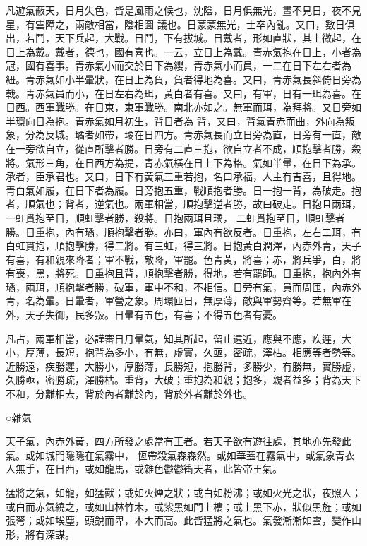 \begin{pinyinscope}
 凡遊氣蔽天，日月失色，皆是風雨之候也，沈陰，日月俱無光，晝不見日，夜不見星，有雲障之，兩敵相當，陰相圖
 議也。日蒙蒙無光，士卒內亂。又曰，數日俱出，若鬥，天下兵起，大戰。日鬥，下有拔城。日戴者，形如直狀，其上微起，在日上為戴。戴者，德也，國有喜也。一云，立日上為戴。青赤氣抱在日上，小者為冠，國有喜事。青赤氣小而交於日下為纓，青赤氣小而員，一二在日下左右者為紐。青赤氣如小半暈狀，在日上為負，負者得地為喜。又曰，青赤氣長斜倚日旁為戟。青赤氣員而小，在日左右為珥，黃白者有喜。又曰，有軍，日有一珥為喜。在日西。西軍戰勝。在日東，東軍戰勝。南北亦如之。無軍而珥，為拜將。又日旁如半環向日為抱。青赤氣如月初生，背日者為
 背，又曰，背氣青赤而曲，外向為叛象，分為反城。璚者如帶，璚在日四方。青赤氣長而立日旁為直，日旁有一直，敵在一旁欲自立，從直所擊者勝。日旁有二直三抱，欲自立者不成，順抱擊者勝，殺將。氣形三角，在日西方為提，青赤氣橫在日上下為格。氣如半暈，在日下為承。承者，臣承君也。又曰，日下有黃氣三重若抱，名曰承福，人主有吉喜，且得地。青白氣如履，在日下者為履。日旁抱五重，戰順抱者勝。日一抱一背，為破走。抱者，順氣也；背者，逆氣也。兩軍相當，順抱擊逆者勝，故曰破走。日抱且兩珥，一虹貫抱至日，順虹擊者勝，殺將。日抱兩珥且璚，
 二虹貫抱至日，順虹擊者勝。日重抱，內有璚，順抱擊者勝。亦曰，軍內有欲反者。日重抱，左右二珥，有白虹貫抱，順抱擊勝，得二將。有三虹，得三將。日抱黃白潤澤，內赤外青，天子有喜，有和親來降者；軍不戰，敵降，軍罷。色青黃，將喜；赤，將兵爭，白，將有喪，黑，將死。日重抱且背，順抱擊者勝，得地，若有罷師。日重抱，抱內外有璚，兩珥，順抱擊者勝，破軍，軍中不和，不相信。日旁有氣，員而周匝，內赤外青，名為暈。日暈者，軍營之象。周環匝日，無厚薄，敵與軍勢齊等。若無軍在外，天子失御，民多叛。日暈有五色，有喜；不得五色者有憂。



 凡占，兩軍相當，必謹審日月暈氣，知其所起，留止遠近，應與不應，疾遲，大小，厚薄，長短，抱背為多小，有無，虛實，久亟，密疏，澤枯。相應等者勢等。近勝遠，疾勝遲，大勝小，厚勝薄，長勝短，抱勝背，多勝少，有勝無，實勝虛，久勝亟，密勝疏，澤勝枯。重背，大破；重抱為和親；抱多，親者益多；背為天下不和，分離相去，背於內者離於內，背於外者離於外也。



 ○雜氣



 天子氣，內赤外黃，四方所發之處當有王者。若天子欲有遊往處，其地亦先發此氣。或如城門隱隱在氣霧中，
 恆帶殺氣森森然。或如華蓋在霧氣中，或氣象青衣人無手，在日西，或如龍馬，或雜色鬱鬱衝天者，此皆帝王氣。



 猛將之氣，如龍，如猛獸；或如火煙之狀；或白如粉沸；或如火光之狀，夜照人；或白而赤氣繞之，或如山林竹木，或紫黑如門上樓；或上黑下赤，狀似黑旌；或如張弩；或如埃塵，頭銳而卑，本大而高。此皆猛將之氣也。氣發漸漸如雲，變作山形，將有深謀。




\end{pinyinscope}
